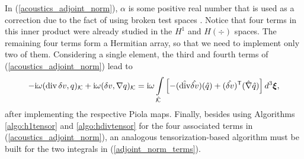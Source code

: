In (\ref{acoustics_adjoint_norm}), $\alpha$ is some positive real number that is used as a correction due to the fact of using broken test spaces \cite{petrides2017adaptive}. Notice that four terms in this inner product were already studied in the $H^1$ and $H(\div)$ spaces. The remaining four terms form a Hermitian array, so that we need to implement only two of them. Considering a single element, the third and fourth terms of (\ref{acoustics_adjoint_norm}) lead to
%
\begin{equation}
    -\mathrm{i}\omega(\operatorname{div} \delta v,q)_{\mathcal{K}} +\mathrm{i}\omega(\delta v, \nabla q)_{\mathcal{K}}=
    \mathrm{i}\omega\int\limits_{\hat{\mathcal{K}}}\left[-(\hat{\operatorname{div}}\hat{\delta v})(\hat{q})+ (\hat{\delta v})^{\mathsf{T}}(\hat{\nabla}\hat{q}) \right]d^3\boldsymbol{\xi},
\label{adjoint_norm_terms}
\end{equation}
%
after implementing the respective Piola maps. Finally, besides using Algorithms \ref{algo:h1tensor} and \ref{algo:hdivtensor} for the four associated terms in (\ref{acoustics_adjoint_norm}), an analogous tensorization-based algorithm must be built for the two integrals in (\ref{adjoint_norm_terms}).

